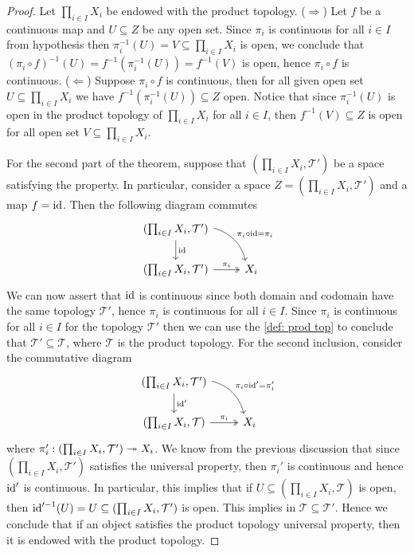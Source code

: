 \begin{proof}
  Let \(\prod_{i \in I} X_i\) be endowed with the product topology.
  (\(\Rightarrow\)) Let \(f\) be a continuous map and \(U \subseteq Z\) be any
  open set. Since \(\pi_i\) is continuous for all \(i \in I\) from hypothesis
  then \(\pi_i^{-1}(U) = V \subseteq \prod_{i \in I} X_i\) is open, we conclude
  that \((\pi_i \circ f)^{-1}(U) = f^{-1}(\pi_i^{-1}(U)) = f^{-1}(V)\) is open,
  hence \(\pi_i \circ f\) is continuous. (\(\Leftarrow\)) Suppose \(\pi_i \circ
  f\) is continuous, then for all given open set \(U \subseteq \prod_{i \in I}
  X_i\) we have \(f^{-1}(\pi_i^{-1}(U)) \subseteq Z\) open. Notice that since
  \(\pi_i^{-1}(U)\) is open in the product topology of \(\prod_{i \in I} X_i\)
  for all \(i \in I\), then \(f^{-1}(V) \subseteq Z\) is open for all open set
  \(V \subseteq \prod_{i \in I} X_i\).

  For the second part of the theorem, suppose that \((\prod_{i \in I} X_i,
  \mathcal T')\) be a space satisfying the property. In particular, consider a
  space \(Z = (\prod_{i \in I} X_i, \mathcal T')\) and a map \(f = \operatorname{id}\). Then
  the following diagram commutes
  \[
    \begin{tikzcd}
      (\prod_{i \in I} X_i, \mathcal T')
      \ar[d, "\Id"]
      \ar[dr, bend left, "\pi_i \circ \Id = \pi_i"] \\
      (\prod_{i \in I} X_i, \mathcal T')
      \ar[r, two heads, "\pi_i"]
        &X_i
    \end{tikzcd}
  \]
  We can now assert that \(\operatorname{id}\) is continuous since both domain and codomain
  have the same topology \(\mathcal T'\), hence \(\pi_i\) is continuous for all
  \(i \in I\). Since \(\pi_i\) is continuous for all \(i \in I\) for the
  topology \(\mathcal T'\) then we can use the \cref{def: prod top} to conclude
  that \(\mathcal T' \subseteq \mathcal T\), where \(\mathcal T\) is the product
  topology. For the second inclusion, consider the commutative diagram
  \[
    \begin{tikzcd}
      (\prod_{i \in I} X_i, \mathcal T')
      \ar[d, "\Id'"]
      \ar[dr, bend left, "\pi_i \circ \Id' = \pi_i'"] \\
      (\prod_{i \in I} X_i, \mathcal T)
      \ar[r, two heads, "\pi_i"]
        &X_i
    \end{tikzcd}
  \]
  where \(\pi_i': (\prod_{i \in I} X_i, \mathcal T') \twoheadrightarrow X_i\). We know from
  the previous discussion that since \((\prod_{i \in I} X_i, \mathcal T')\)
  satisfies the universal property, then \(\pi_i'\) is continuous and hence
  \(\operatorname{id}'\) is continuous. In particular, this implies that if  \(U \subseteq
  (\prod_{i \in I} X_i, \mathcal T)\) is open, then \(\operatorname{id}'^{-1}(U) = U
  \subseteq (\prod_{i \in I} X_i, \mathcal T')\) is open. This implies in
  \(\mathcal T \subseteq \mathcal T'\). Hence we conclude that if an object
  satisfies the product topology universal property, then it is endowed with the
  product topology.
\end{proof}

